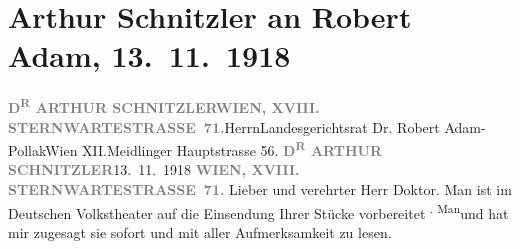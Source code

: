 

         
         \renewcommand{\erwaehntePersonen}{Personen: Robert Adam}
         \renewcommand{\erwaehnteOrte}{Orte: Meidlinger Hauptstraße, Sternwartestraße, Volkstheater, Wien, XII., Meidling}
         \renewcommand{\erwaehnteWerke}{Werke: Der Fremde, Yppl. Idylle in fünf Akten}
               \section[Arthur Schnitzler an Robert Adam, 13. 11. 1918]{ Arthur Schnitzler an Robert Adam, 13. 11. 1918}\nopagebreak{}\rehead{ }\begin{ledgroupsized}[t]{13cm}\normalsize\beginnumbering \toendnotes[C]{\smallbreak\pagebreak[2]} 
\toendnotes[C]{\smallbreak}\pstart{}{\pb}\textcolor{gray}{\textbf{D\textsuperscript{R} ARTHUR
                                SCHNITZLER}}\pend{}\pstart{}\textcolor{gray}{\textbf{WIEN, XVIII. STERNWARTESTRASSE 71.}}\pend{}{\bigskip}\pstart{}{\pb}Herrn\pend{}\pstart{}Landesgerichtsrat Dr. Robert Adam-Pollak\pend{}\pstart{}Wien XII.\pend{}\pstart{}Meidlinger Hauptstrasse 56.\pend{}{\bigskip}\pstart
           {\pb}\textcolor{gray}{\textbf{D\textsuperscript{R} ARTHUR
                                    SCHNITZLER}}\hfill 13. 11. 1918\pend
           \pstart
           \textcolor{gray}{\textbf{WIEN, XVIII. STERNWARTESTRASSE 71.}}\pend
           \pstart{}Lieber und verehrter Herr Doktor.\pend\pstart
           Man ist im Deutschen Volkstheater auf die
                    Einsendung Ihrer Stücke vorbereitet \substVorne{}\textsuperscript{. Man}\substDazwischen{}und\substHinten{} hat mir zugesagt sie sofort und mit aller Aufmerksamkeit zu lesen.

\end{ledgroupsized}
